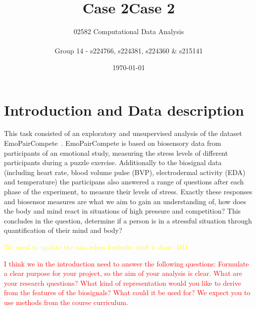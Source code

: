 \documentclass{article}
\title{Case 2} %
\author{02582 Computational Data Analysis \\ \\ Group 14 - s224766, s224381, s224360 \& s215141}
\date{\today}
\begin{document}
%
\maketitle

\doublespacing
\renewcommand{\baselinestretch}{1}\normalsize

\renewcommand{\baselinestretch}{1}\normalsize
\thispagestyle{fancy} %


\title{Case 2}


\section*{Introduction and Data description}

\noindent
This task consisted of an exploratory and unsupervised analysis of the dataset EmoPairCompete~\cite{datasource}. EmoPairCompete is based on biosensory data from participants of an emotional study, measuring the stress levels of different participants during a puzzle exercise. Additionally to the biosignal data (including heart rate, blood volume pulse (BVP), electrodermal activity (EDA) and temperature) the participans also answered a range of questions after each phase of the experiment, to measure their levels of stress. Exactly these responses and biosensor measures are what we aim to gain an understanding of, how does the body and mind react in situations of high pressure and competition?  This concludes in the question, determine if a person is in a stressful situation through quantification of their mind and body?

\textcolor{yellow}{We need to update the aim when frederiks stuff is done :DD}

\textcolor{red}{I think we in the introduction need to answer the following questions: Formulate a clear purpose for your project, so the aim of your analysis is clear. What are your research questions? What kind of representation would you like to derive from the features of the biosignals? What could it be used for? We expect you to use methods from the course curriculum. }
\end{document}
